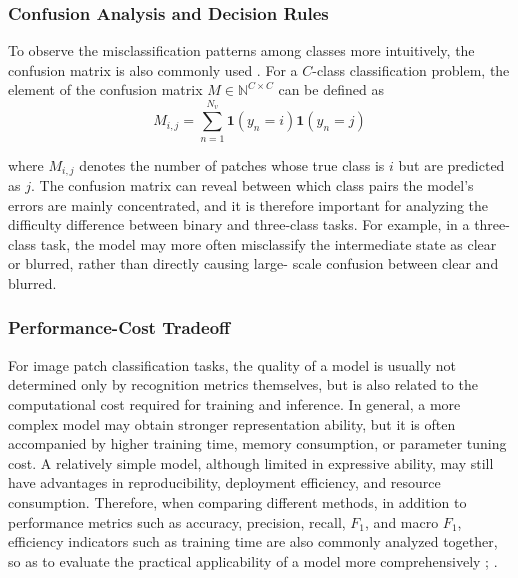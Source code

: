 \subsubsection{Confusion Analysis and Decision Rules}
\par To observe the misclassification patterns among classes more intuitively,
the confusion matrix is also commonly used
\cite[pp.~151--160,~256--280]{schutze2008introduction}. For a $C$-class
classification problem, the element of the confusion matrix
$M\in\mathbb{N}^{C\times C}$ can be defined as
\begin{equation}
    M_{i,j}=
    \sum_{n=1}^{N_v}\mathbf{1}(y_n=i)\mathbf{1}(\hat{y}_n=j)
    \label{eq:confusion-basic}
\end{equation}
\par where $M_{i,j}$ denotes the number of patches whose true class is $i$ but
are predicted as $j$. The confusion matrix can reveal between which class pairs
the model's errors are mainly concentrated, and it is therefore important for
analyzing the difficulty difference between binary and three-class tasks. For
example, in a three-class task, the model may more often misclassify the
intermediate state as clear or blurred, rather than directly causing large-
scale confusion between clear and blurred.

\subsubsection{Performance-Cost Tradeoff}
\par For image patch classification tasks, the quality of a model is usually not
determined only by recognition metrics themselves, but is also related to the
computational cost required for training and inference. In general, a more
complex model may obtain stronger representation ability, but it is often
accompanied by higher training time, memory consumption, or parameter tuning
cost. A relatively simple model, although limited in expressive ability, may
still have advantages in reproducibility, deployment efficiency, and resource
consumption. Therefore, when comparing different methods, in addition to
performance metrics such as accuracy, precision, recall, $F_1$, and macro $F_1$,
efficiency indicators such as training time are also commonly analyzed together,
so as to evaluate the practical applicability of a model more comprehensively
\cite[pp.~321--618]{murphy2022pml};
\cite[pp.~96--123,~416--437]{goodfellow2016deep}.
